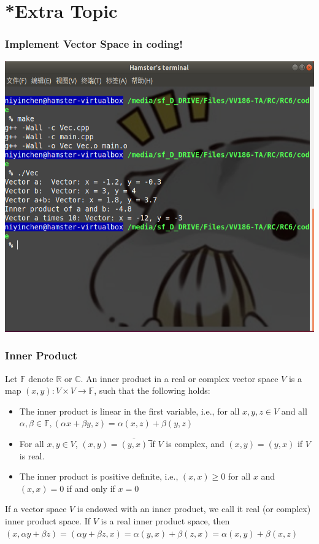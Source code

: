 \documentclass{beamer}
\begin{document}
\section{*Extra Topic}
\begin{frame}
    \frametitle{Implement Vector Space in coding!}
    \centering
    \includegraphics[width=1\textheight]{code1.png}
\end{frame}
\begin{frame}
    \frametitle{Inner Product }
    Let $\mathbb{F}$ denote $\mathbb{R}$ or $\mathbb{C}$. An inner product in a real or complex vector space 
    $V$ is a map $(x,y):V \times V \to \mathbb{F}$, such that the following holds: 
    \begin{itemize}
        \item The inner product is linear in the first variable, i.e., for all $x, y, z \in V$ and all $\alpha, \beta \in \mathbb{F}, (\alpha x+\beta y,z)=\alpha(x,z)+\beta(y,z)$
        \item For all $x,y \in V$, $(x,y)=\overline{(y,x)}$ ̅if $V$ is complex,  and $(x,y)=(y,x)$ if $V$ is real.
        \item The inner product is positive definite, i.e., $(x,x)\geq 0$ for all $x$ and $(x,x)=0$ if and only if $x=0$
    \end{itemize}
	If a vector space $V$ is endowed with an inner product, we call it real 
    (or complex) inner product space. If $V$ is a real inner product space, 
   then $(x, \alpha y+\beta z)=(\alpha y+\beta z,x)=\alpha(y,x)+\beta (z,x)=\alpha (x,y)+\beta (x,z)$

\end{frame}
\end{document}

